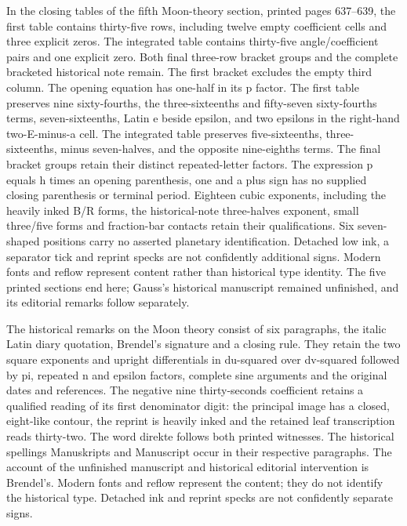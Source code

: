 In the closing tables of the fifth Moon-theory section, printed pages 637--639, the first table contains thirty-five rows, including twelve empty coefficient cells and three explicit zeros. The integrated table contains thirty-five angle/coefficient pairs and one explicit zero. Both final three-row bracket groups and the complete bracketed historical note remain. The first bracket excludes the empty third column. The opening equation has one-half in its p factor. The first table preserves nine sixty-fourths, the three-sixteenths and fifty-seven sixty-fourths terms, seven-sixteenths, Latin e beside epsilon, and two epsilons in the right-hand two-E-minus-a cell. The integrated table preserves five-sixteenths, three-sixteenths, minus seven-halves, and the opposite nine-eighths terms. The final bracket groups retain their distinct repeated-letter factors. The expression p equals h times an opening parenthesis, one and a plus sign has no supplied closing parenthesis or terminal period. Eighteen cubic exponents, including the heavily inked B/R forms, the historical-note three-halves exponent, small three/five forms and fraction-bar contacts retain their qualifications. Six seven-shaped positions carry no asserted planetary identification. Detached low ink, a separator tick and reprint specks are not confidently additional signs. Modern fonts and reflow represent content rather than historical type identity. The five printed sections end here; Gauss's historical manuscript remained unfinished, and its editorial remarks follow separately.

The historical remarks on the Moon theory consist of six paragraphs, the italic Latin diary quotation, Brendel's signature and a closing rule. They retain the two square exponents and upright differentials in du-squared over dv-squared followed by pi, repeated n and epsilon factors, complete sine arguments and the original dates and references. The negative nine thirty-seconds coefficient retains a qualified reading of its first denominator digit: the principal image has a closed, eight-like contour, the reprint is heavily inked and the retained leaf transcription reads thirty-two. The word direkte follows both printed witnesses. The historical spellings Manuskripts and Manuscript occur in their respective paragraphs. The account of the unfinished manuscript and historical editorial intervention is Brendel's. Modern fonts and reflow represent the content; they do not identify the historical type. Detached ink and reprint specks are not confidently separate signs.

